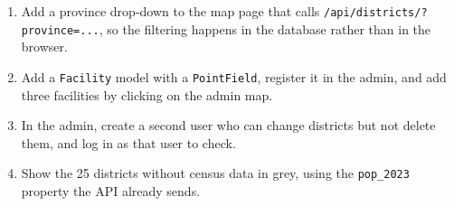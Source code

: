 \documentclass{article}
\newcommand{\cd}[1]{\texttt{#1}}
\begin{document}
\begin{enumerate}
  \item Add a province drop-down to the map page that calls
        \cd{/api/districts/?province=...}, so the filtering happens in the
        database rather than in the browser.
  \item Add a \cd{Facility} model with a \cd{PointField}, register it in
        the admin, and add three facilities by clicking on the admin map.
  \item In the admin, create a second user who can change districts but
        not delete them, and log in as that user to check.
  \item Show the 25 districts without census data in grey, using the
        \cd{pop\_2023} property the API already sends.
\end{enumerate}
\end{document}
